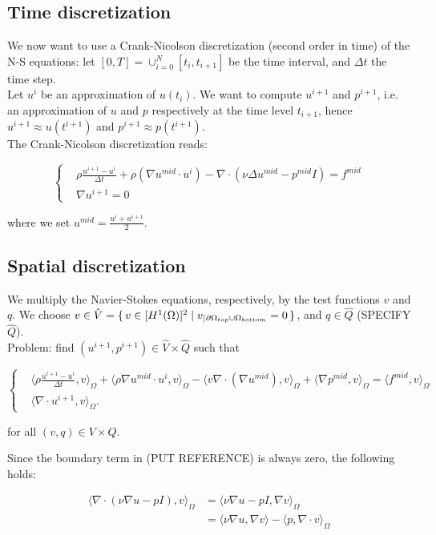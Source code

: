 \documentclass[11pt,a4paper,titlepage]{report}
\begin{document}
\subsection{Time discretization}
We now want to use a Crank-Nicolson discretization (second order in time) of the N-S equations: let $[0, T] = \cup^N_{i=0} [t_i, t_{i+1}] $ be the time interval, and $\Delta t$ the time step. \\
Let $u^i$ be an approximation of $u(t_i)$. We want to compute $u^{i+1}$ and $p^{i+1}$, i.e. an approximation of $u$ and $p$ respectively at the time level $t_{i+1}$, hence $u^{i+1} \approx u(t^{i+1})$ and $p^{i+1} \approx p(t^{i+1})$. \\
The Crank-Nicolson discretization reads:

\[
\left\{  
\begin{aligned}
& \rho \frac{u^{i+1} - u^i}{\Delta t} + \rho (\nabla u^{mid} \cdot u^i) - \nabla \cdot (\nu \Delta u^{mid} - p^{mid}I) = f^{mid} \\
& \nabla u^{i+1} = 0
\end{aligned}
\right.
\]

where we set $u^{mid} = \frac{u^i + u^{i+1}}{2}$.

\subsection{Spatial discretization}
We multiply the Navier-Stokes equations, respectively, by the test functions $v$ and $q$. We choose $v \in \hat{V} = \set{v \in [H^1(\Omega)]^2 | v_|{_{\partial \Omega_{top} \cup \Omega_{bottom}}} = 0}$, and $q \in \hat{Q}$ (SPECIFY $\hat{Q}$). \\
Problem: find $(u^{i+1}, p^{i+1}) \in \hat{V} \times \hat{Q}$ such that 

\[
\left\{  
\begin{aligned}
& \langle \rho \frac{u^{i+1} - u^i}{\Delta t},v \rangle_\Omega
+ \langle \rho \nabla u^{mid} \cdot u^i  ,v \rangle_\Omega
- \langle v \nabla \cdot (\nabla u^{mid}) ,v \rangle_\Omega
+ \langle \nabla p^{mid} ,v \rangle_\Omega = \langle f^{mid} ,v \rangle_\Omega \\
& \langle \nabla \cdot u^{i+1},v \rangle_\Omega.
\end{aligned}
\right.
\]

for all $(v,q) \in V \times Q$.

Since the boundary term in (PUT REFERENCE) is always zero, the following holds:

\[
\begin{aligned}
\langle \nabla \cdot (\nu \nabla u - pI) ,v \rangle_\Omega & = \langle \nu \nabla u - pI ,\nabla v \rangle_\Omega \\
														& = \langle \nu \nabla u  ,\nabla v \rangle  - \langle p ,\nabla \cdot v \rangle_\Omega										
\end{aligned}
\]
\end{document}
